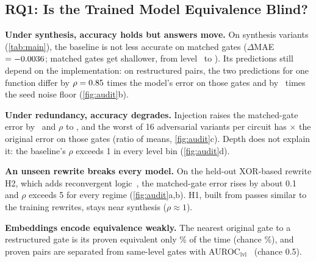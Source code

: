 

\subsection{RQ1: Is the Trained Model Equivalence Blind?}\label{sec:rq1}
\noindent\textbf{Under synthesis, accuracy holds but answers move.} On synthesis variants (\cref{tab:main}), the baseline is not
less accurate on matched gates ($\Delta$MAE $=-0.0036$; matched gates get shallower, from level \DepthSynOrig\ to \DepthSynVar). Its
predictions still depend on the implementation: on restructured pairs, the two predictions for one function differ
by $\rho=0.85$ times the model's error on those gates and by \IncSynOverNoiseBase\ times the seed
noise floor (\cref{fig:audit}b).

\noindent\textbf{Under redundancy, accuracy degrades.} Injection raises the matched-gate error by \BaseDInj\ and
$\rho$ to \BaseRhoInj, and the worst of 16 adversarial variants per circuit has \BaseWorstRatio$\times$ the original
error on those gates (ratio of means, \cref{fig:audit}c). Depth does not explain it: the baseline's $\rho$
exceeds 1 in every level bin (\cref{fig:audit}d).

\noindent\textbf{An unseen rewrite breaks every model.} On the held-out XOR-based rewrite H2, which adds reconvergent logic~\cite{DBLP:journals/tc/ParkerM75}, the
matched-gate error rises by about 0.1 and $\rho$ exceeds 5 for every regime (\cref{fig:audit}a,b). H1, built from passes similar to the training rewrites, stays near synthesis ($\rho\approx1$).

\noindent\textbf{Embeddings encode equivalence weakly.} The nearest original gate to a restructured
gate is its proven equivalent only \BaseTopRS\% of the time (chance \Chance\%), and proven pairs are separated
from same-level gates with AUROC$_\mathrm{lvl}$ \BaseAUCHard\ (chance 0.5).

